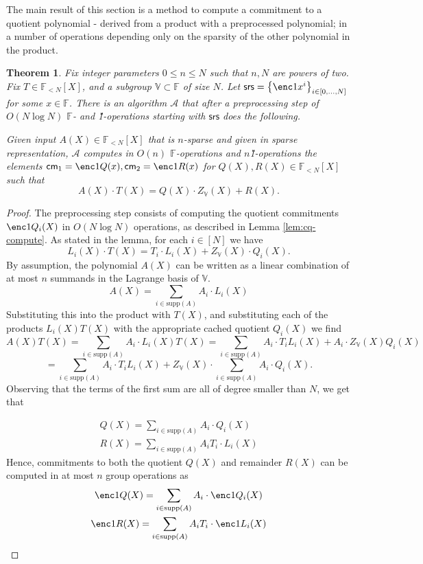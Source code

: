 \documentclass[11pt]{article} %
\newcommand{\alg}{\ensuremath{\mathscr{A}}\xspace}
\newcommand{\F}{\ensuremath{\mathbb F}\xspace}
\newcommand{\srs}{\ensuremath{\mathsf{srs}}\xspace}
\newcommand{\cm}{\ensuremath{\mathsf{cm}}\xspace}
\newcommand{\sett}[2]{\ensuremath{\set{#1}_{#2}}\xspace}
\newcommand{\set}[1]{\ensuremath{\left\{#1\right\}}\xspace}
\newcommand{\polysofdeg}[1]{\ensuremath{\F_{< #1}[X]}\xspace}
\newtheorem{thm}[lemma]{Theorem}
\newcommand{\bigspace}{\ensuremath{\mathbb{V}}\xspace}
\newcommand{\witsize}{\ensuremath{n}\xspace}
\newcommand{\tabsize}{\ensuremath{N}\xspace}
\newcommand{\tabruntime}{\ensuremath{\tabsize\log\tabsize}\xspace}
\newcommand{\supp}[1]{\ensuremath{\mathrm{supp}(#1)}\xspace}
\begin{document}
The main result of this section is a method to compute a commitment to a quotient polynomial - derived from a product with a preprocessed polynomial; in a number of operations depending only on the sparsity of the other polynomial in the product. 
\begin{thm}\label{thm:sec3main}
Fix integer parameters $0\leq n\leq N$ such that $n,N$ are powers of two. Fix $T\in \polysofdeg{\tabsize}$, and a subgroup $\bigspace\subset \F$ of size \tabsize. Let $\srs=\sett{\enc1{x^i}}{i\in[0,\ldots,\tabsize]}$ for some $x\in \F$. 
There is an algorithm \alg that after a preprocessing step of $O(\tabruntime)$ \F- and \G1-operations starting with \srs does the following.


Given input $A(X)\in \polysofdeg{\tabsize}$ that is \witsize-sparse and given in sparse representation, \alg computes in 
$O(\witsize)$ \F-operations and \witsize \G1-operations the elements
$\cm_1=\enc1{Q(x)},\cm_2=\enc1{R(x)}$ for $Q(X),R(X)\in \polysofdeg{\tabsize}$ such that
\[A(X)\cdot T(X) = Q(X)\cdot Z_{\bigspace}(X) + R(X).\]
\end{thm}
\begin{proof}
    The preprocessing step consists of computing the quotient commitments $\enc1{Q_i(X)}$ in $O(\tabruntime)$ operations, as described in Lemma \ref{lem:cq-compute}. As stated in the lemma,
    for each $i\in[\tabsize]$ we have
    \[L_i(X)\cdot T(X)=T_i\cdot L_i(X) + Z_\bigspace(X)\cdot Q_i(X).\]
    By assumption, the polynomial $A(X)$ can be written as a linear combination of
    at most $\witsize$ summands in the Lagrange basis of $\bigspace$.
    \[ A(X) = \sum_{i \in \supp{A}} A_i\cdot L_i(X) \]
    Substituting this into the product with $T(X)$, and substituting each of the products
    $L_i(X) T(X)$ with the appropriate cached quotient $Q_i(X)$ we find
    \[ A(X) T(X) = \sum_{i\in \supp{A}} A_i\cdot  L_i(X) T(X) =\sum_{i \in
    \supp{A}} A_i \cdot T_i L_i(X) + A_i\cdot Z_\bigspace(X) Q_i(X) \] 
   \[=\sum_{i \in  \supp{A}} A_i \cdot T_i L_i(X) +Z_\bigspace(X)\cdot \sum_{i \in
    \supp{A}} A_i \cdot Q_i(X).\] 
Observing that the terms of the first sum are all of degree smaller than \tabsize, we get that

    \begin{gather*}
Q(X)=\sum_{i \in  \supp{A}} A_i \cdot Q_i(X) \\
        R(X) = \sum_{i \in \supp{A}} A_i T_i \cdot L_i(X)
    \end{gather*}
    Hence, commitments to both the quotient $Q(X)$ and remainder $R(X)$ can be computed in
   at most \witsize group operations as 
    \begin{gather*}
        \enc1{Q(X)} = \sum_{i \in \supp{A}} A_i \cdot \enc1{Q_i(X)} \\
        \enc1{R(X)} = \sum_{i \in \supp{A}} A_i T_i \cdot \enc1{L_i(X)}
    \end{gather*}
\end{proof}
\end{document}
